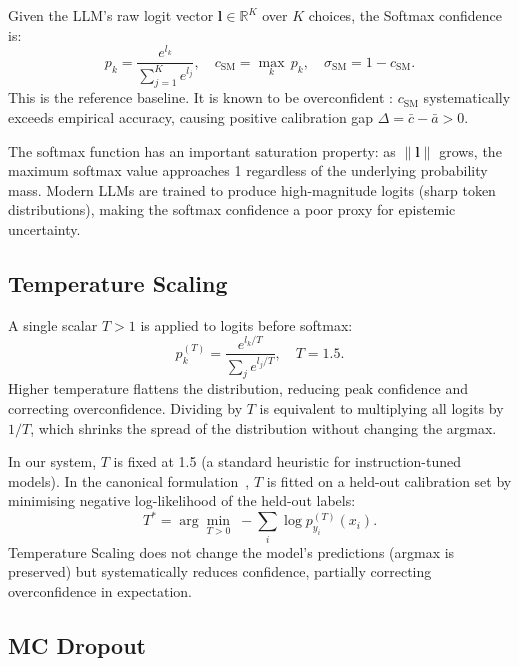 \documentclass[conference]{IEEEtran}
\begin{document}
Given the LLM's raw logit vector $\mathbf{l} \in \mathbb{R}^K$ over
$K$ choices, the Softmax confidence is:
\begin{equation}
    p_k = \frac{e^{l_k}}{\sum_{j=1}^{K} e^{l_j}}, \quad
    c_{\text{SM}} = \max_k\, p_k, \quad
    \sigma_{\text{SM}} = 1 - c_{\text{SM}}.
    \label{eq:softmax}
\end{equation}
This is the reference baseline. It is known to be overconfident
\cite{guo2017calibration}: $c_{\text{SM}}$ systematically exceeds
empirical accuracy, causing positive calibration gap
$\Delta = \bar{c} - \bar{a} > 0$.

The softmax function has an important saturation property: as
$\|\mathbf{l}\|$ grows, the maximum softmax value approaches 1
regardless of the underlying probability mass. Modern LLMs are trained
to produce high-magnitude logits (sharp token distributions), making
the softmax confidence a poor proxy for epistemic uncertainty.

\subsection{Temperature Scaling}

A single scalar $T > 1$ is applied to logits before softmax:
\begin{equation}
    p_k^{(T)} = \frac{e^{l_k/T}}{\sum_{j} e^{l_j/T}}, \quad T = 1.5.
    \label{eq:temp}
\end{equation}
Higher temperature flattens the distribution, reducing peak
confidence and correcting overconfidence. Dividing by $T$ is
equivalent to multiplying all logits by $1/T$, which shrinks
the spread of the distribution without changing the argmax.

In our system, $T$ is fixed at 1.5 (a standard heuristic for
instruction-tuned models). In the canonical formulation~\cite{guo2017calibration},
$T$ is fitted on a held-out calibration set by minimising negative
log-likelihood of the held-out labels:
\begin{equation}
    T^* = \arg\min_{T>0}\; -\sum_{i}\log p^{(T)}_{y_i}(x_i).
\end{equation}
Temperature Scaling does not change the model's predictions (argmax
is preserved) but systematically reduces confidence, partially
correcting overconfidence in expectation.

\subsection{MC Dropout}
\end{document}
